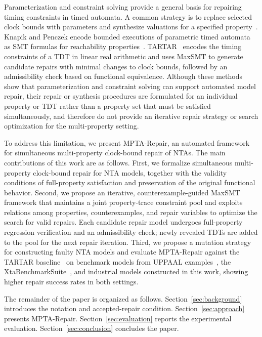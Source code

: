 Parameterization and constraint solving provide a general basis for
repairing timing constraints in timed automata. A common strategy is to
replace selected clock bounds with parameters and synthesize valuations
for a specified property~\cite{andre2019decidable}. Knapik and Penczek
encode bounded executions of parametric timed automata as SMT formulas
for reachability properties~\cite{knapik2016smt}.
TARTAR~\cite{kolbl2019clock} encodes the timing constraints of a TDT in
linear real arithmetic and uses MaxSMT to generate candidate repairs
with minimal changes to clock bounds, followed by an admissibility check
based on functional equivalence. Although these methods show that
parameterization and constraint solving can support automated model
repair, their repair or synthesis procedures are formulated for an
individual property or TDT rather than a property set that must be
satisfied simultaneously, and therefore do not provide an iterative
repair strategy or search optimization for the multi-property setting.

To address this limitation, we present MPTA-Repair, an automated
framework for simultaneous multi-property clock-bound repair of NTAs.
The main contributions of this work are as follows. First, we formalize
simultaneous multi-property clock-bound repair for NTA models, together
with the validity conditions of full-property satisfaction and
preservation of the original functional behavior. Second, we propose an
iterative, counterexample-guided MaxSMT framework that maintains a joint
property-trace constraint pool and exploits relations among properties,
counterexamples, and repair variables to optimize the search for valid
repairs.
Each candidate repair model undergoes full-property regression
verification and an admissibility check; newly revealed TDTs are added
to the pool for the next repair iteration. Third, we propose a mutation
strategy for constructing faulty NTA models and evaluate MPTA-Repair
against the TARTAR baseline~\cite{kolbl2019clock} on benchmark models
from UPPAAL examples~\cite{behrmann2004tutorial}, the
XtaBenchmarkSuite~\cite{farkas2018benchmarks}, and industrial models
constructed in this work, showing higher repair success rates in both
settings.

The remainder of the paper is organized as follows.
Section~\ref{sec:background} introduces the notation and
accepted-repair condition. Section~\ref{sec:approach} presents
MPTA-Repair. Section~\ref{sec:evaluation} reports the experimental
evaluation. Section~\ref{sec:conclusion} concludes the paper.
